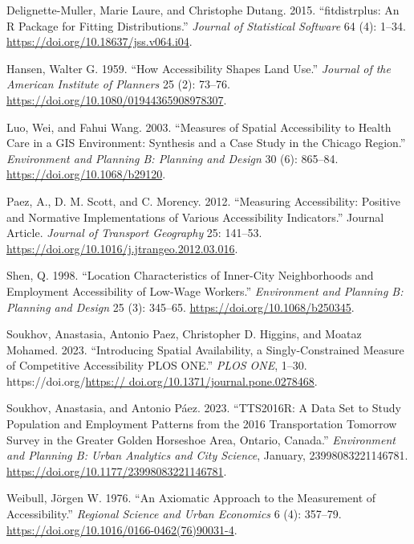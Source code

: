 \documentclass[12pt, oneside]{report}
\newlength{\cslhangindent}
\newlength{\cslentryspacingunit} %
\newenvironment{CSLReferences}[2] %
 {%
  \setlength{\parindent}{0pt}
  \ifodd #1
  \let\oldpar\par
  \def\par{\hangindent=\cslhangindent\oldpar}
  \fi
  \setlength{\parskip}{#2\cslentryspacingunit}
 }%
 {}
\begin{document}
\hypertarget{refs}{}
\begin{CSLReferences}{1}{0}
\leavevmode{}%
Delignette-Muller, Marie Laure, and Christophe Dutang. 2015.
{``{fitdistrplus}: An {R} Package for Fitting Distributions.''}
\emph{Journal of Statistical Software} 64 (4): 1--34.
\url{https://doi.org/10.18637/jss.v064.i04}.

\leavevmode{}%
Hansen, Walter G. 1959. {``How Accessibility Shapes Land Use.''}
\emph{Journal of the American Institute of Planners} 25 (2): 73--76.
\url{https://doi.org/10.1080/01944365908978307}.

\leavevmode{}%
Luo, Wei, and Fahui Wang. 2003. {``Measures of Spatial Accessibility to
Health Care in a GIS Environment: Synthesis and a Case Study in the
Chicago Region.''} \emph{Environment and Planning B: Planning and
Design} 30 (6): 865--84. \url{https://doi.org/10.1068/b29120}.

\leavevmode{}%
Paez, A., D. M. Scott, and C. Morency. 2012. {``Measuring Accessibility:
Positive and Normative Implementations of Various Accessibility
Indicators.''} Journal Article. \emph{Journal of Transport Geography}
25: 141--53. \url{https://doi.org/10.1016/j.jtrangeo.2012.03.016}.

\leavevmode{}%
Shen, Q. 1998. {``Location Characteristics of Inner-City Neighborhoods
and Employment Accessibility of Low-Wage Workers.''} \emph{Environment
and Planning B: Planning and Design} 25 (3): 345--65.
\url{https://doi.org/10.1068/b250345}.

\leavevmode{}%
Soukhov, Anastasia, Antonio Paez, Christopher D. Higgins, and Moataz
Mohamed. 2023. {``Introducing Spatial Availability, a Singly-Constrained
Measure of Competitive Accessibility \textbar{} {PLOS ONE}.''}
\emph{PLOS ONE}, 1--30.
https://doi.org/\href{https://\%20doi.org/10.1371/journal.pone.0278468}{https://
doi.org/10.1371/journal.pone.0278468}.

\leavevmode{}%
Soukhov, Anastasia, and Antonio Páez. 2023. {``{TTS2016R}: {A} Data Set
to Study Population and Employment Patterns from the 2016
{Transportation Tomorrow Survey} in the {Greater Golden Horseshoe} Area,
{Ontario}, {Canada}.''} \emph{Environment and Planning B: Urban
Analytics and City Science}, January, 23998083221146781.
\url{https://doi.org/10.1177/23998083221146781}.

\leavevmode{}%
Weibull, Jörgen W. 1976. {``An Axiomatic Approach to the Measurement of
Accessibility.''} \emph{Regional Science and Urban Economics} 6 (4):
357--79. \url{https://doi.org/10.1016/0166-0462(76)90031-4}.

\end{CSLReferences}
\end{document}
